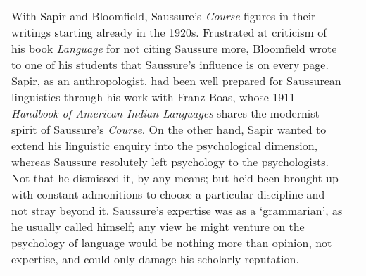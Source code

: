 \documentclass[12pt]{article}
\begin{document}
\begin{flushleft}
\begin{supertabular}{m{0.24415985in}m{5.89766in}}
With Sapir and Bloomfield, Saussure’s \textit{Course} figures in their writings starting already in the 1920s. Frustrated at criticism of his book \textit{Language} for not citing Saussure more, Bloomfield wrote to one of his students that Saussure’s influence is on every page. Sapir, as an anthropologist, had been well prepared for Saussurean linguistics through his work with Franz Boas, whose 1911 \textit{Handbook of American Indian Languages} shares the modernist spirit of Saussure’s \textit{Course}. On the other hand, Sapir wanted to extend his linguistic enquiry into the psychological dimension, whereas Saussure resolutely left psychology to the psychologists. Not that he dismissed it, by any means; but he’d been brought up with constant admonitions to choose a particular discipline and not stray beyond it. Saussure’s expertise was as a ‘grammarian’, as he usually called himself; any view he might venture on the psychology of language would be nothing more than opinion, not expertise, and could only damage his scholarly reputation. 


\end{supertabular}
\end{flushleft}
\end{document}
